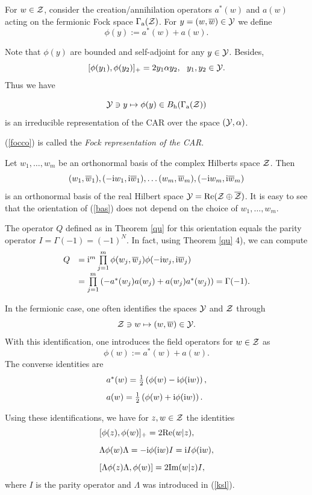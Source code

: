 \documentclass{svmult}
\newcommand{\beq}{\begin{equation}}
\newcommand{\eeq}{\end{equation}}
\def\bet{\begin{theorem}}
\def\eet{\end{theorem}}
\def\Im{{\rm Im}}
\def\Re{{\rm Re}}
\def\bar{\overline}
\def\h{{\rm h}}
\def\cZ{{\cal Z}}
\def\cY{{\cal Y}}
\def\a{{\rm a}}
\def\i{{\rm i}}
\begin{document}
For $w\in\cZ$, consider the creation/annihilation operators
$a^*(w)$ and $a(w)$ acting on the fermionic Fock space $\Gamma_\a(\cZ)$.
 For $y=(w,\bar w)\in\cY$ we define 
\[\phi(y):=a^*(w)+a(w).\]





Note that $\phi(y)$ are bounded and self-adjoint for any $y\in \cY$. Besides,
\[[\phi(y_1),\phi(y_2)]_+=2 y_1\alpha y_2,\ \ y_1,y_2\in\cY.\]
Thus we have
\bet
\beq\cY\ni y\mapsto\phi(y)\in B_\h(\Gamma_\a(\cZ))\label{focco}\eeq
is an irreducible representation of the CAR over the space $(\cY,\alpha)$.
\eet
(\ref{focco}) is called the {\em  Fock representation of the CAR}.


Let $w_1,\dots,w_m$ be an orthonormal basis of the complex Hilberts space
$\cZ$. Then 
\beq(w_1,\bar w_1),(-\i w_1,\i\bar w_1),\dots
(w_m,\bar w_m),(-\i w_m,\i\bar w_m)\label{bas}\eeq
is an orthonormal basis of the real Hilbert space
$\cY=\Re(\cZ\oplus\bar\cZ)$. It is easy to see that the orientation of
(\ref{bas}) does not depend on the choice of
 $w_1,\dots,w_m$.

The operator $Q$ defined as in Theorem \ref{qu} for this orientation equals
the parity operator $I=\Gamma(-1)=(-1)^N$. In fact, using Theorem \ref{qu} 4),
we can compute
\[\begin{array}{rl}
Q&=\i^m
\prod\limits_{j=1}^m\phi(w_j,\bar w_j)\phi(-\i w_j,\i\bar w_j)\\[3mm]
&=\prod\limits_{j=1}^m\left(-a^*(w_j)a(w_j)+a(w_j)a^*(w_j)\right)=\Gamma(-1)
.\end{array}\]


In the fermionic case, one
 often identifies the spaces $\cY$ and $\cZ$ through
\beq \cZ\ni w\mapsto(w,\bar w)\in\cY.\label{identi2}\eeq
With this identification, one introduces the field operators for $w\in\cZ$ as
\[\phi(w):=a^*(w)+a(w).\]
The converse identities are
\[\begin{array}{l}
a^*(w)=\frac{1}{2}\left(\phi(w)-\i\phi(\i w)\right),\\[3mm]
a(w)=\frac{1}{2}\left(\phi(w)+\i\phi(\i w)\right).
\end{array}\]

Using these identifications, we have for $z,w\in\cZ$
the identities
\[\begin{array}{l}[\phi(z),\phi(w)]_+=2\Re(w|z),
\\[3mm]
\Lambda\phi(w)\Lambda=-\i\phi(\i w)I=\i I\phi(\i w),
\\[3mm]
[\Lambda \phi(z)\Lambda,\phi(w)]=2\Im(w|z) I,
\end{array}\]
where $I$ is the parity operator and $\Lambda$ was introduced in (\ref{ksl}).
\end{document}
